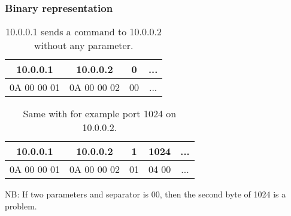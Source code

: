 \documentclass{beamer}
\begin{document}
\begin{frame}
    \frametitle{Binary representation}
    
    \begin{example}
        \begin{table}[htb]
            \centering
            \begin{tabular}{|c|c|c|c|}
                \hline
                10.0.0.1    & 10.0.0.2    & 0  & ... \\
                \hline
                0A 00 00 01 & 0A 00 00 02 & 00 & ... \\
                \hline
            \end{tabular}
            \caption*{10.0.0.1 sends a command to 10.0.0.2 without any parameter.}
            \vspace{-1.4em}
        \end{table}
    \end{example}
    \vfill   
    \begin{example}
        \begin{table}[htb]
            \centering
            \begin{tabular}{|c|c|c|c|c|}
                \hline
                10.0.0.1    & 10.0.0.2    & 1  & 1024  & ... \\
                \hline
                0A 00 00 01 & 0A 00 00 02 & 01 & 04 00 & ... \\
                \hline
            \end{tabular}
            \caption*{Same with for example port 1024 on 10.0.0.2.}
            {\small NB: If two parameters and separator is 00, then the second byte of 1024 is a problem.}
            \vspace{-1em}
        \end{table}
    \end{example}
\end{frame}
\end{document}
